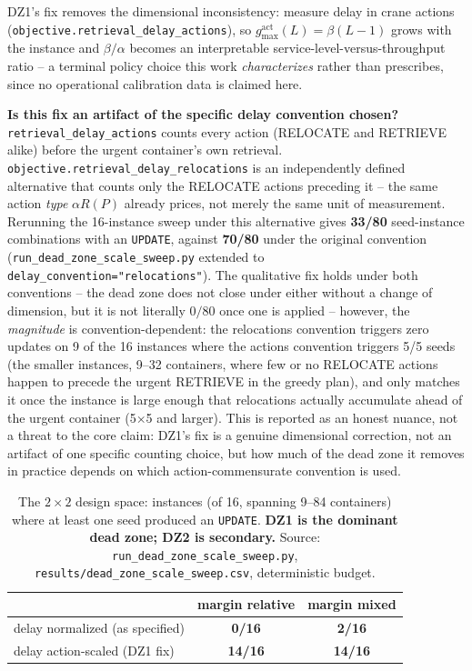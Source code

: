 \documentclass[11pt]{article}
\begin{document}
DZ1's fix removes the dimensional inconsistency: measure delay in crane
actions (\texttt{objective.retrieval\_delay\_actions}), so
$g_{\max}^{\text{act}}(L) = \beta(L-1)$ grows with the instance and
$\beta/\alpha$ becomes an interpretable service-level-versus-throughput
ratio -- a terminal policy choice this work \emph{characterizes} rather
than prescribes, since no operational calibration data is claimed here.

\textbf{Is this fix an artifact of the specific delay convention chosen?}
\texttt{retrieval\_delay\_actions} counts every action (RELOCATE and
RETRIEVE alike) before the urgent container's own retrieval.
\texttt{objective.retrieval\_delay\_relocations} is an independently
defined alternative that counts only the RELOCATE actions preceding
it -- the same action \emph{type} $\alpha R(P)$ already prices, not merely
the same unit of measurement. Rerunning the 16-instance sweep under this
alternative gives \textbf{33/80} seed-instance combinations with an
\texttt{UPDATE}, against \textbf{70/80} under the original convention
(\texttt{run\_dead\_zone\_scale\_sweep.py} extended to
\texttt{delay\_convention="relocations"}). The qualitative fix holds under
both conventions -- the dead zone does not close under either without a
change of dimension, but it is not literally $0/80$ once one is applied --
however, the \emph{magnitude} is convention-dependent: the relocations
convention triggers zero updates on 9 of the 16 instances where the
actions convention triggers 5/5 seeds (the smaller instances, 9--32
containers, where few or no RELOCATE actions happen to precede the urgent
RETRIEVE in the greedy plan), and only matches it once the instance is
large enough that relocations actually accumulate ahead of the urgent
container (5$\times$5 and larger). This is reported as an honest nuance,
not a threat to the core claim: DZ1's fix is a genuine dimensional
correction, not an artifact of one specific counting choice, but how much
of the dead zone it removes in practice depends on which
action-commensurate convention is used.

\begin{table}[h]
\centering
\small
\begin{tabular}{lcc}
\hline
 & margin relative & margin mixed \\
\hline
delay normalized (as specified) & \textbf{0/16} & \textbf{2/16} \\
delay action-scaled (DZ1 fix)   & \textbf{14/16} & \textbf{14/16} \\
\hline
\end{tabular}
\caption{The $2\times2$ design space: instances (of 16, spanning 9--84
containers) where at least one seed produced an \texttt{UPDATE}.
\textbf{DZ1 is the dominant dead zone; DZ2 is secondary.} Source:
\texttt{run\_dead\_zone\_scale\_sweep.py},
\texttt{results/dead\_zone\_scale\_sweep.csv}, deterministic budget.}
\label{tab:dead-zone-2x2}
\end{table}
\end{document}
